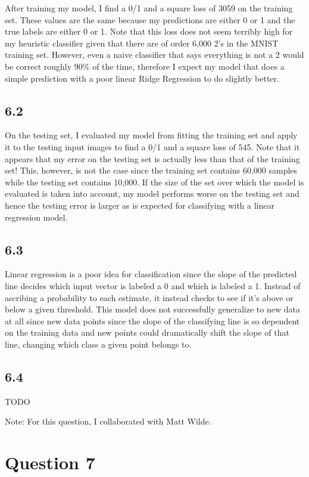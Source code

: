 \documentclass[12pt]{amsart}
\begin{document}
After training my model, I find a 0/1 and a square loss of 3059 on the training set.  These values are the same because my predictions are either 0 or 1 and the true labels are either 0 or 1.  Note that this loss does not seem terribly high for my heuristic classifier given that there are of order 6,000 2's in the MNIST training set.  However, even a naive classifier that says everything is not a 2 would be correct roughly $90\%$ of the time, therefore I expect my model that does a simple prediction with a poor linear Ridge Regression to do slightly better.

\subsection*{6.2}
On the testing set, I evaluated my model from fitting the training set and apply it to the testing input images to find a 0/1 and a square loss of 545.  Note that it appears that my error on the testing set is actually less than that of the training set!  This, however, is not the case since the training set contains 60,000 samples while the testing set contains 10,000.  If the size of the set over which the model is evaluated is taken into account, my model performs worse on the testing set and hence the testing error is larger as is expected for classifying with a linear regression model.

\subsection*{6.3}
Linear regression is a poor idea for classification since the slope of the predicted line decides which input vector is labeled a 0 and which is labeled a 1.  Instead of ascribing a probability to each estimate, it instead checks to see if it's above or below a given threshold.  This model does not successfully generalize to new data at all since new data points since the slope of the classifying line is so dependent on the training data and new points could dramatically shift the slope of that line, changing which class a given point belongs to.

\subsection*{6.4}
TODO

Note: For this question, I collaborated with Matt Wilde.


\section*{Question 7}
\end{document}
